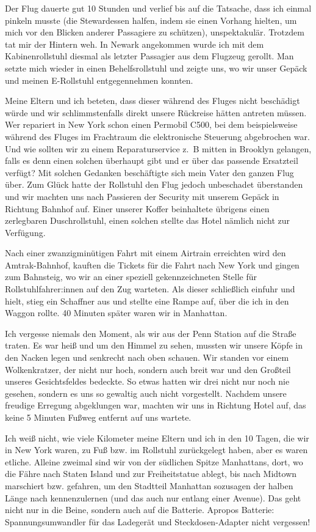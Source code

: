 \documentclass[fontsize=14pt,a4paper,headinclude,DIV=calc,automark]{scrbook}
\begin{document}
Der Flug dauerte gut 10 Stunden und verlief bis auf die Tatsache, dass ich einmal pinkeln musste (die Stewardessen halfen, indem sie einen Vorhang hielten, um mich vor den Blicken anderer Passagiere zu schützen), unspektakulär. Trotzdem tat mir der Hintern weh. In Newark angekommen wurde ich mit dem Kabinenrollstuhl diesmal als letzter Passagier aus dem Flugzeug gerollt. Man setzte mich wieder in einen Behelfsrollstuhl und zeigte uns, wo wir unser Gepäck und meinen E-Rollstuhl entgegennehmen konnten.

Meine Eltern und ich beteten, dass dieser während des Fluges nicht beschädigt würde und wir schlimmstenfalls direkt unsere Rückreise hätten antreten müssen. Wer repariert in New York schon einen Permobil C500, bei dem beispielsweise während des Fluges im Frachtraum die elektronische Steuerung abgebrochen war. Und wie sollten wir zu einem Reparaturservice z.~B mitten in Brooklyn gelangen, falls es denn einen solchen überhaupt gibt und er über das passende Ersatzteil verfügt? Mit solchen Gedanken beschäftigte sich mein Vater den ganzen Flug über. Zum Glück hatte der Rollstuhl den Flug jedoch unbeschadet überstanden und wir machten uns nach Passieren der Security mit unserem Gepäck in Richtung Bahnhof auf. Einer unserer Koffer beinhaltete übrigens einen zerlegbaren Duschrollstuhl, einen solchen stellte das Hotel nämlich nicht zur Verfügung.

Nach einer zwanzigminütigen Fahrt mit einem Airtrain erreichten wird den Amtrak-Bahnhof, kauften die Tickets für die Fahrt nach New York und gingen zum Bahnsteig, wo wir an einer speziell gekennzeichneten Stelle für Rollstuhlfahrer:innen auf den Zug warteten. Als dieser schließlich einfuhr und hielt, stieg ein Schaffner aus und stellte eine Rampe auf, über die ich in den Waggon rollte. 40 Minuten später waren wir in Manhattan.

Ich vergesse niemals den Moment, als wir aus der Penn Station auf die Straße traten. Es war heiß und um den Himmel zu sehen, mussten wir unsere Köpfe in den Nacken legen und senkrecht nach oben schauen. Wir standen vor einem Wolkenkratzer, der nicht nur hoch, sondern auch breit war und den Großteil unseres Gesichtsfeldes bedeckte. So etwas hatten wir drei nicht nur noch nie gesehen, sondern es uns so gewaltig auch nicht vorgestellt. Nachdem unsere freudige Erregung abgeklungen war, machten wir uns in Richtung Hotel auf, das keine 5 Minuten Fußweg entfernt auf uns wartete.

Ich weiß nicht, wie viele Kilometer meine Eltern und ich in den 10 Tagen, die wir in New York waren, zu Fuß bzw. im Rollstuhl zurückgelegt haben, aber es waren etliche. Alleine zweimal sind wir von der südlichen Spitze Manhattans, dort, wo die Fähre nach Staten Island und zur Freiheitstatue ablegt, bis nach Midtown marschiert bzw. gefahren, um den Stadtteil Manhattan sozusagen der halben Länge nach kennenzulernen (und das auch nur entlang einer Avenue). Das geht nicht nur in die Beine, sondern auch auf die Batterie. Apropos Batterie: Spannungsumwandler für das Ladegerät und Steckdosen-Adapter nicht vergessen!
\end{document}
